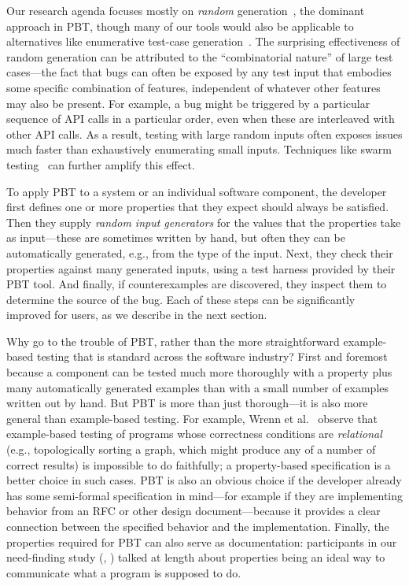 Our research agenda focuses mostly on {\em random}
generation~\cite{hamlet1994random}, the dominant approach in PBT,
though many of our tools would also be applicable to alternatives
like enumerative test-case
generation~\cite{DBLP:conf/haskell/RuncimanNL08, leancheck}.  The
surprising effectiveness of random generation can be attributed to the
``combinatorial nature'' of large test cases---the fact that bugs can
often be exposed by any test input that embodies some specific combination
of features, independent of whatever other features may also be
present.  For example, a bug might be triggered by a particular
sequence of API calls in a particular order, even when
these are interleaved with other API calls. As a result, testing with
large random inputs often exposes issues much faster than exhaustively
enumerating small inputs.  Techniques like swarm
testing~\cite{groce2012swarm} can further amplify this effect.

To apply PBT to a system or an individual software component, the
developer first defines one
or more properties that they expect should always be satisfied. Then
they supply {\em random input generators} for the values that the
properties take as input---these are sometimes written by hand, but
often they can be automatically generated, e.g., from the type of the
input. Next, they check their properties against many generated
inputs, using a test harness provided by their PBT tool. And finally, if
counterexamples are discovered, they inspect them to determine the
source of the bug.  Each of these steps can be significantly improved for users,
as we describe in the next section.

\smallskip

Why go to the trouble of PBT, rather than the more straightforward
example-based testing that is standard across the software industry?
First and foremost because a component can be tested much more
thoroughly with a property plus many automatically generated examples
than with a small number of examples written out by hand.
But
PBT is more than just thorough---it is also more general than example-based
testing. For example, Wrenn et al.~\cite{wrenn2021using} observe that example-based testing
of programs whose correctness conditions are {\em relational} (e.g.,
topologically sorting a graph, which might
produce any of a number of correct results) is impossible to do
faithfully; a property-based specification is a better choice in
such cases.
PBT is also
an obvious choice if
the developer already has some semi-formal
specification in mind---for example if they are implementing behavior from an RFC or
other design document---because it provides a clear connection between the
specified behavior and the implementation.
Finally, the
properties required for PBT can also serve as documentation:
participants in our need-finding study (, )
talked at length about properties being an ideal way to communicate what a
program is supposed to do.

